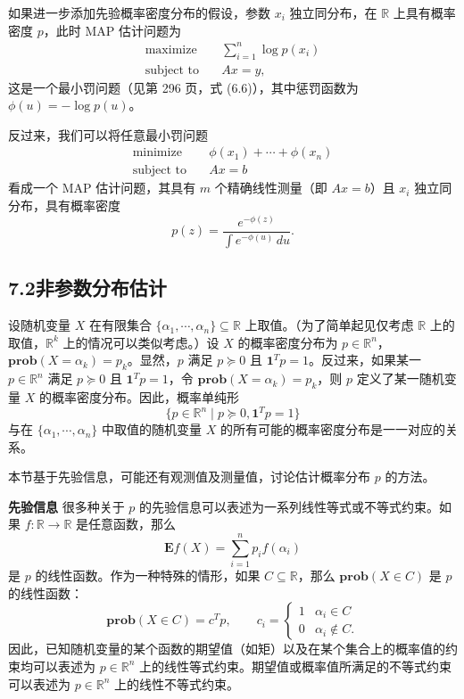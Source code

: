 \documentclass[UTF8, 12pt, fontset=fandol, oneside]{ctexart}
\begin{document}
如果进一步添加先验概率密度分布的假设，参数 $x_i$ 独立同分布，在 $\mathbb{R}$ 上具有概率密度 $p$，此时 MAP 估计问题为
\[
\begin{aligned}
\text{maximize}\quad & \sum_{i=1}^n \log p(x_i)\\
\text{subject to}\quad & Ax=y,
\end{aligned}
\]
这是一个最小罚问题（见第 296 页，式 (6.6)），其中惩罚函数为 $\phi(u)=-\log p(u)$。

反过来，我们可以将任意最小罚问题
\[
\begin{aligned}
\text{minimize}\quad & \phi(x_1)+\cdots+\phi(x_n)\\
\text{subject to}\quad & Ax=b
\end{aligned}
\]
看成一个 MAP 估计问题，其具有 $m$ 个精确线性测量（即 $Ax=b$）且 $x_i$ 独立同分布，具有概率密度
\[
p(z)=\frac{e^{-\phi(z)}}{\int e^{-\phi(u)}\,du}.
\]

\subsection*{7.2\quad 非参数分布估计}

设随机变量 $X$ 在有限集合 $\{\alpha_1,\cdots,\alpha_n\}\subseteq\mathbb{R}$ 上取值。（为了简单起见仅考虑 $\mathbb{R}$ 上的取值，$\mathbb{R}^k$ 上的情况可以类似考虑。）设 $X$ 的概率密度分布为 $p\in\mathbb{R}^n$，$\mathbf{prob}(X=\alpha_k)=p_k$。显然，$p$ 满足 $p\succeq 0$ 且 $\mathbf{1}^T p=1$。反过来，如果某一 $p\in\mathbb{R}^n$ 满足 $p\succeq 0$ 且 $\mathbf{1}^Tp=1$，令 $\mathbf{prob}(X=\alpha_k)=p_k$，则 $p$ 定义了某一随机变量 $X$ 的概率密度分布。因此，概率单纯形
\[
\{p\in\mathbb{R}^n\mid p\succeq 0,\mathbf{1}^Tp=1\}
\]
与在 $\{\alpha_1,\cdots,\alpha_n\}$ 中取值的随机变量 $X$ 的所有可能的概率密度分布是一一对应的关系。

本节基于先验信息，可能还有观测值及测量值，讨论估计概率分布 $p$ 的方法。

\noindent\textbf{先验信息}\quad
很多种关于 $p$ 的先验信息可以表述为一系列线性等式或不等式约束。如果 $f:\mathbb{R}\to\mathbb{R}$ 是任意函数，那么
\[
\mathbf{E}f(X)=\sum_{i=1}^n p_i f(\alpha_i)
\]
是 $p$ 的线性函数。作为一种特殊的情形，如果 $C\subseteq\mathbb{R}$，那么 $\mathbf{prob}(X\in C)$ 是 $p$ 的线性函数：
\[
\mathbf{prob}(X\in C)=c^T p,\qquad
c_i=
\begin{cases}
1 & \alpha_i\in C\\
0 & \alpha_i\notin C.
\end{cases}
\]
因此，已知随机变量的某个函数的期望值（如矩）以及在某个集合上的概率值的约束均可以表述为 $p\in\mathbb{R}^n$ 上的线性等式约束。期望值或概率值所满足的不等式约束可以表述为 $p\in\mathbb{R}^n$ 上的线性不等式约束。
\end{document}
